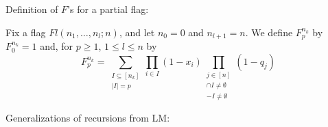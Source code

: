 \documentclass[11pt]{article}
\begin{document}



\pagebreak Definition of $F$'s for a partial flag: 
\begin{definition}
    Fix a flag $Fl(n_1,\ldots,n_l;n)$, and let $n_0 = 0$ and $n_{l+1} = n$.  We define $F_p^{n_k}$ by $F_0^{n_k} = 1$ and, for $p\geq 1$, $1 \leq l \leq n$ by
    \begin{equation*}
        F_p^{n_k} = \sum_{\substack{I \subseteq [n_k] \\ |I| = p}} \prod_{i \in I}(1-x_i) \prod_{\substack{j \in [n] \\ [n_{j-1}+1, \ldots, n_j] \cap I \neq \emptyset \\ [n_{j}+1, \ldots, n_{l+1}] - I \neq \emptyset}}(1-q_j)
    \end{equation*}
\end{definition}

Generalizations of recursions from LM:
\end{document}
